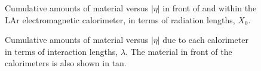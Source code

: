 \begin{figure}
{	}\hfill
	\caption{Cumulative amounts of material versus $|\eta|$ in front of and within the LAr electromagnetic calorimeter, in terms of radiation lengths, $X_0$.}
	\label{fig:ATLAS-calorimeters-X0}
\end{figure}

\begin{figure}
	\centering
	\caption{Cumulative amounts of material versus $|\eta|$ due to each calorimeter in terms of interaction lengths, $\lambda$. The material in front of the calorimeters is also shown in tan.}
	\label{fig:ATLAS-calorimeters-lambda0}
\end{figure}



